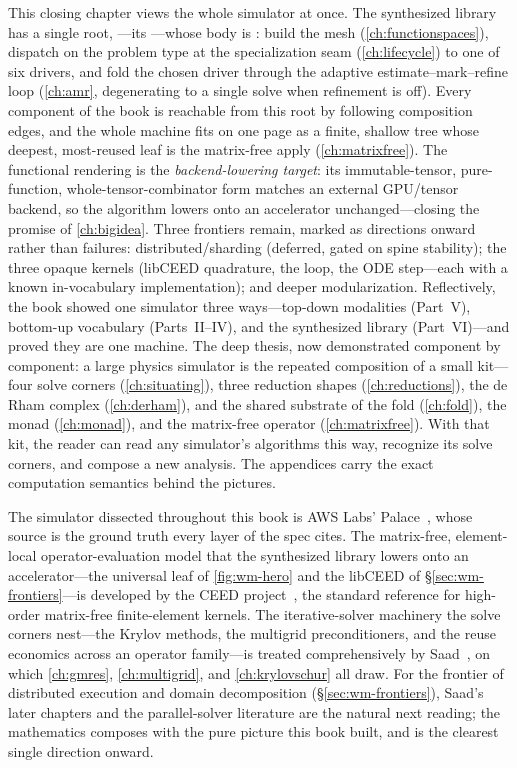 \summarysection
This closing chapter views the whole simulator at once. The synthesized library has a
single root, ---its ---whose body is
: build
the mesh (\cref{ch:functionspaces}), dispatch on the problem type at the specialization
seam (\cref{ch:lifecycle}) to one of six drivers, and fold the chosen driver through the
adaptive estimate--mark--refine loop (\cref{ch:amr}, degenerating to a single solve when
refinement is off). Every component of the book is reachable from this root by following
composition edges, and the whole machine fits on one page as a finite, shallow tree whose
deepest, most-reused leaf is the matrix-free apply (\cref{ch:matrixfree}). The functional
rendering is the \emph{backend-lowering target}: its immutable-tensor, pure-function,
whole-tensor-combinator form matches an external GPU/tensor backend, so the algorithm
lowers onto an accelerator unchanged---closing the promise of \cref{ch:bigidea}. Three
frontiers remain, marked as directions onward rather than failures: distributed/sharding
(deferred, gated on spine stability); the three  opaque kernels (libCEED
quadrature, the  loop, the ODE step---each with a known in-vocabulary
implementation); and deeper modularization. Reflectively, the book showed one simulator
three ways---top-down modalities (Part~V), bottom-up vocabulary (Parts~II--IV), and the
synthesized library (Part~VI)---and proved they are one machine. The deep thesis, now
demonstrated component by component: a large physics simulator is the repeated composition
of a small kit---four solve corners (\cref{ch:situating}), three reduction shapes
(\cref{ch:reductions}), the de Rham complex (\cref{ch:derham}), and the shared substrate of
the fold (\cref{ch:fold}), the monad (\cref{ch:monad}), and the matrix-free operator
(\cref{ch:matrixfree}). With that kit, the reader can read any simulator's algorithms this
way, recognize its solve corners, and compose a new analysis. The appendices carry the exact
computation semantics behind the pictures.

\furtherreading
The simulator dissected throughout this book is AWS Labs' Palace~\citep{palace2023}, whose
source is the ground truth every layer of the spec cites. The matrix-free, element-local
operator-evaluation model that the synthesized library lowers onto an accelerator---the
universal leaf of \cref{fig:wm-hero} and the libCEED  of
\S\ref{sec:wm-frontiers}---is developed by the CEED project~\citep{ceed2021}, the standard
reference for high-order matrix-free finite-element kernels. The iterative-solver
machinery the solve corners nest---the Krylov methods, the multigrid preconditioners, and
the reuse economics across an operator family---is treated comprehensively by
Saad~\citep{saad2003}, on which \cref{ch:gmres}, \cref{ch:multigrid}, and
\cref{ch:krylovschur} all draw. For the frontier of distributed execution and domain
decomposition (\S\ref{sec:wm-frontiers}), Saad's later chapters and the parallel-solver
literature are the natural next reading; the mathematics composes with the pure picture
this book built, and is the clearest single direction onward.

